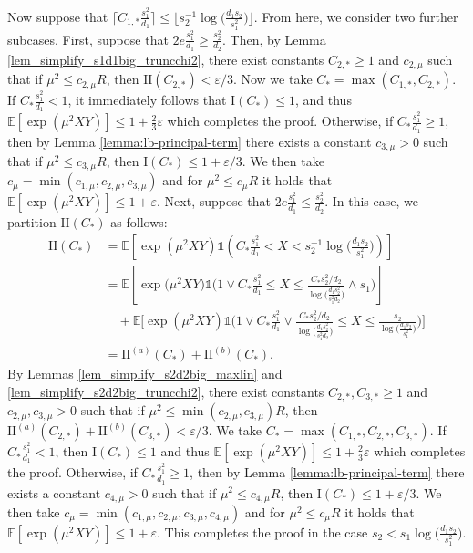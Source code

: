 \documentclass{article}
\newcommand{\EE}{\mathbb{E}}
\newcommand{\one}{\mathds{1}}
\newcommand{\eps}{\varepsilon} %
\newcommand{\Ct}{C_{*}}
\theoremstyle{remark}
\begin{document}
Now suppose that $\lceil C_{1,*}\frac{s_1^2}{d_1}\rceil \leq \lfloor s_2^{-1}\log \big(\frac{d_1s_2}{s_1^2}\big)\rfloor$. From here, we consider two further subcases. First, suppose that $2e\frac{s_1^2}{d_1} \geq \frac{s_2^2}{d_2}$. Then, by Lemma \ref{lem_simplify_s1d1big_truncchi2}, there exist constants $C_{2,*} \geq 1$ and $c_{2,\mu}$ such that if $\mu^2 \leq c_{2,\mu}R$, then $\text{II}(C_{2,*}) < \eps/3$. Now we take $C_* = \max(C_{1,*}, C_{2,*})$. If $C_* \frac{s_1^2}{d_1} < 1$, it immediately follows that $\text{I}(C_*) \leq 1$, and thus $\EE[\exp(\mu^2XY)] \leq 1 + \frac23\eps$ which completes the proof. Otherwise, if $C_* \frac{s_1^2}{d_1} \geq 1$, then by Lemma \ref{lemma:lb-principal-term} there exists a constant $c_{3,\mu} > 0$ such that if $\mu^2 \leq c_{3,\mu}R$, then $\text{I}(C_*) \leq 1 + \eps/3$. We then take $c_\mu = \min(c_{1, \mu}, c_{2, \mu}, c_{3,\mu})$ and for $\mu^2 \leq c_{\mu}R$ it holds that $\EE[\exp(\mu^2XY)]\leq 1 + \eps$. Next, suppose that $2e\frac{s_1^2}{d_1} \leq \frac{s_2^2}{d_2}$. In this case, we partition $\text{II}(C_*)$ as follows:
\begin{align*}
    \text{II}(C_*) &= \EE[\exp(\mu^2XY)\one(\Ct \frac{s_1^2}{d_1} < X < s_2^{-1}\log\big(\frac{d_1s_2}{s_1^2}\big))] \\
    &= \EE\left[\exp\big(\mu^2XY\big)\one\bigg(1 \vee \Ct \frac{s_1^2}{d_1} \leq X \leq \frac{\Ct s_2^2/d_2}{\log\big(\frac{d_1s_2^2}{s_1^2d_2}\big)}\wedge s_1\bigg)\right] \\
    &\quad +\EE\bigg[\exp(\mu^2XY)\one\bigg( 1 \vee \Ct \frac{s_1^2}{d_1} \vee  \frac{\Ct s_2^2/d_2}{\log\big(\frac{d_1s_2^2}{s_1^2d_2}\big)} \leq X \leq \frac{s_2}{\log\big(\frac{d_1s_2}{s_1^2}\big)}\bigg)\bigg] \\
    &= \text{II}^{(a)}(C_*) + \text{II}^{(b)}(C_*).
\end{align*}
By Lemmas \ref{lem_simplify_s2d2big_maxlin} and \ref{lem_simplify_s2d2big_truncchi2}, there exist constants $C_{2,*}, C_{3,*} \geq 1$ and $c_{2,\mu}, c_{3,\mu} > 0$ such that if $\mu^2 \leq \min(c_{2,\mu}, c_{3,\mu})R$, then $\text{II}^{(a)}(C_{2,*}) + \text{II}^{(b)}(C_{3,*}) < \eps/3$. We take $C_* = \max(C_{1,*}, C_{2,*}, C_{3,*})$. If $C_* \frac{s_1^2}{d_1} < 1$, then $\text{I}(C_*) \leq 1$ and thus $\EE[\exp(\mu^2XY)] \leq 1 + \frac23\eps$ which completes the proof. Otherwise, if $C_* \frac{s_1^2}{d_1} \geq 1$, then by Lemma \ref{lemma:lb-principal-term} there exists a constant $c_{4,\mu} > 0$ such that if $\mu^2 \leq c_{4,\mu}R$, then $\text{I}(C_*) \leq 1 + \eps/3$. We then take $c_\mu = \min(c_{1, \mu}, c_{2, \mu}, c_{3,\mu}, c_{4,\mu})$ and for $\mu^2 \leq c_{\mu}R$ it holds that $\EE[\exp(\mu^2XY)]\leq 1 + \eps$. This completes the proof in the case $s_2 < s_1 \log \big(\frac{d_1s_2}{s_1^2}\big)$.
\end{document}
